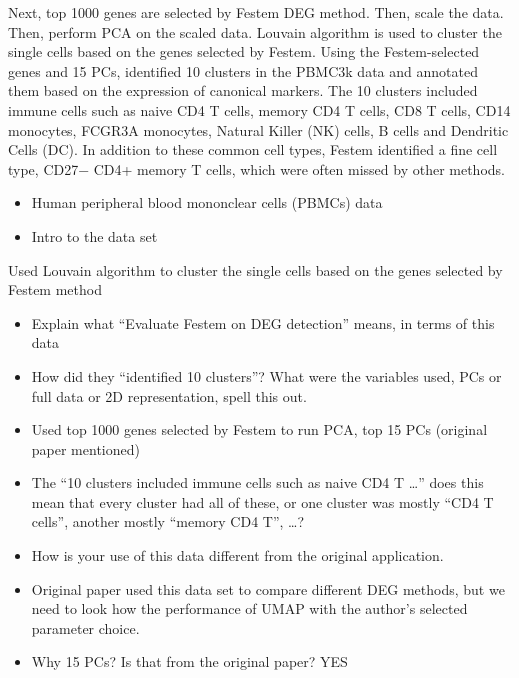 \documentclass[
  12pt]{article}
\begin{document}
Next, top 1000 genes are selected by Festem \citep{Chen2023} DEG method.
Then, scale the data. Then, perform PCA on the scaled data. Louvain
algorithm is used to cluster the single cells based on the genes
selected by Festem. Using the Festem-selected genes and 15 PCs,
identified 10 clusters in the PBMC3k data and annotated them based on
the expression of canonical markers. The 10 clusters included immune
cells such as naive CD4 T cells, memory CD4 T cells, CD8 T cells, CD14
monocytes, FCGR3A monocytes, Natural Killer (NK) cells, B cells and
Dendritic Cells (DC). In addition to these common cell types, Festem
identified a fine cell type, CD27− CD4+ memory T cells, which were often
missed by other methods.

\begin{itemize}
\item
  Human peripheral blood mononclear cells (PBMCs) data
\item
  Intro to the data set
\end{itemize}

Used Louvain algorithm to cluster the single cells based on the genes
selected by Festem method

\begin{itemize}
\item
  Explain what ``Evaluate Festem on DEG detection'' means, in terms of
  this data
\item
  How did they ``identified 10 clusters''? What were the variables used,
  PCs or full data or 2D representation, spell this out.
\item
  Used top 1000 genes selected by Festem to run PCA, top 15 PCs
  (original paper mentioned)
\item
  The ``10 clusters included immune cells such as naive CD4 T \ldots{}''
  does this mean that every cluster had all of these, or one cluster was
  mostly ``CD4 T cells'', another mostly ``memory CD4 T'', \ldots?
\item
  How is your use of this data different from the original application.
\item
  Original paper used this data set to compare different DEG methods,
  but we need to look how the performance of UMAP with the author's
  selected parameter choice.
\item
  Why 15 PCs? Is that from the original paper? YES
\end{itemize}

\citet{Chen2023}
\end{document}
